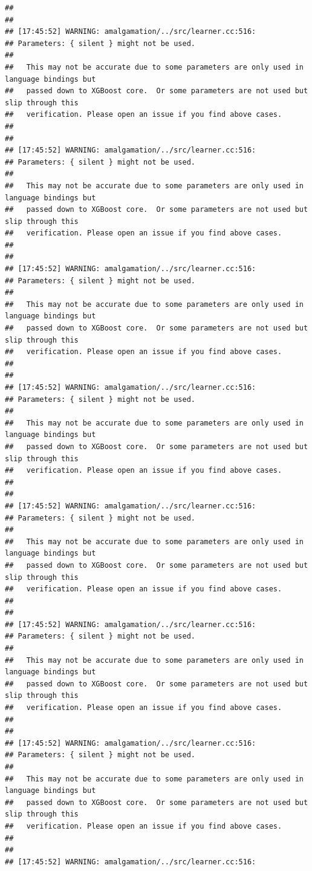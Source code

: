\documentclass[AMS,STIX2COL]{WileyNJD-v2}\usepackage[]{graphicx}\usepackage[]{color}
\makeatletter
\newenvironment{kframe}{%
 \def\at@end@of@kframe{}%
 \ifinner\ifhmode%
  \def\at@end@of@kframe{\end{minipage}}%
  \begin{minipage}{\columnwidth}%
 \fi\fi%
 \def\FrameCommand##1{\hskip\@totalleftmargin \hskip-\fboxsep
 \colorbox{shadecolor}{##1}\hskip-\fboxsep
     \hskip-\linewidth \hskip-\@totalleftmargin \hskip\columnwidth}%
 \MakeFramed {\advance\hsize-\width
   \@totalleftmargin\z@ \linewidth\hsize
   \@setminipage}}%
 {\par\unskip\endMakeFramed%
 \at@end@of@kframe}
\newenvironment{knitrout}{}{} %
\makeatother
\begin{document}
\begin{knitrout}
\begin{kframe}
\begin{verbatim}
## 
## 
## [17:45:52] WARNING: amalgamation/../src/learner.cc:516: 
## Parameters: { silent } might not be used.
## 
##   This may not be accurate due to some parameters are only used in language bindings but
##   passed down to XGBoost core.  Or some parameters are not used but slip through this
##   verification. Please open an issue if you find above cases.
## 
## 
## [17:45:52] WARNING: amalgamation/../src/learner.cc:516: 
## Parameters: { silent } might not be used.
## 
##   This may not be accurate due to some parameters are only used in language bindings but
##   passed down to XGBoost core.  Or some parameters are not used but slip through this
##   verification. Please open an issue if you find above cases.
## 
## 
## [17:45:52] WARNING: amalgamation/../src/learner.cc:516: 
## Parameters: { silent } might not be used.
## 
##   This may not be accurate due to some parameters are only used in language bindings but
##   passed down to XGBoost core.  Or some parameters are not used but slip through this
##   verification. Please open an issue if you find above cases.
## 
## 
## [17:45:52] WARNING: amalgamation/../src/learner.cc:516: 
## Parameters: { silent } might not be used.
## 
##   This may not be accurate due to some parameters are only used in language bindings but
##   passed down to XGBoost core.  Or some parameters are not used but slip through this
##   verification. Please open an issue if you find above cases.
## 
## 
## [17:45:52] WARNING: amalgamation/../src/learner.cc:516: 
## Parameters: { silent } might not be used.
## 
##   This may not be accurate due to some parameters are only used in language bindings but
##   passed down to XGBoost core.  Or some parameters are not used but slip through this
##   verification. Please open an issue if you find above cases.
## 
## 
## [17:45:52] WARNING: amalgamation/../src/learner.cc:516: 
## Parameters: { silent } might not be used.
## 
##   This may not be accurate due to some parameters are only used in language bindings but
##   passed down to XGBoost core.  Or some parameters are not used but slip through this
##   verification. Please open an issue if you find above cases.
## 
## 
## [17:45:52] WARNING: amalgamation/../src/learner.cc:516: 
## Parameters: { silent } might not be used.
## 
##   This may not be accurate due to some parameters are only used in language bindings but
##   passed down to XGBoost core.  Or some parameters are not used but slip through this
##   verification. Please open an issue if you find above cases.
## 
## 
## [17:45:52] WARNING: amalgamation/../src/learner.cc:516: 

\end{verbatim}
\end{kframe}
\end{knitrout}
\end{document}

